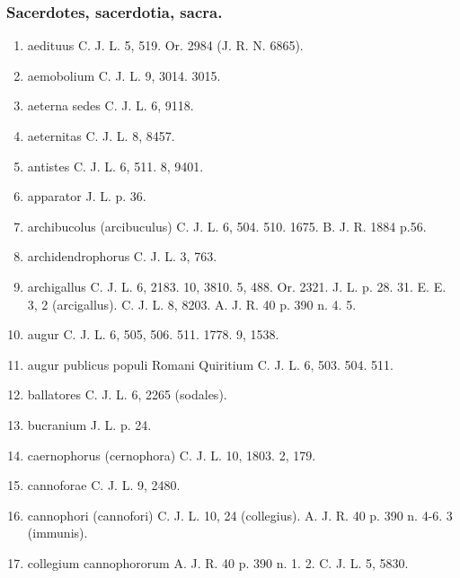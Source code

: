 \documentclass[a4paper, 11pt, oneside, polutonikogreek, german, twocolumn]{article}
\begin{document}
\subsubsection{Sacerdotes, sacerdotia, sacra.}
\begin{enumerate}
\item aedituus C. J. L. 5, 519. Or. 2984 (J. R. N. 6865).

\item aemobolium C. J. L. 9, 3014. 3015.

\item aeterna sedes C. J. L. 6, 9118.

\item aeternitas C. J. L. 8, 8457.

\item antistes C. J. L. 6, 511. 8, 9401.

\item apparator J. L. p. 36.

\item archibucolus (arcibuculus) C. J. L. 6, 504. 510. 1675. B. J. R. 1884 p.56.

\item archidendrophorus C. J. L. 3, 763.

\item archigallus C. J. L. 6, 2183. 10, 3810. 5, 488. Or. 2321. J. L. p. 28. 31. E. E. 3, 2 (arcigallus). C. J. L. 8, 8203. A. J. R. 40 p. 390 n. 4. 5.

\item augur C. J. L. 6, 505, 506. 511. 1778. 9, 1538.

\item augur publicus populi Romani Quiritium C. J. L. 6, 503. 504. 511.

\item ballatores C. J. L. 6, 2265 (sodales).

\item bucranium J. L. p. 24.

\item caernophorus (cernophora) C. J. L. 10, 1803. 2, 179.

\item cannoforae C. J. L. 9, 2480.

\item cannophori (cannofori) C. J. L. 10, 24 (collegius). A. J. R. 40 p. 390 n. 4-6. 3 (immunis).

\item collegium cannophororum A. J. R. 40 p. 390 n. 1. 2. C. J. L. 5, 5830.


\end{enumerate}
\end{document}
